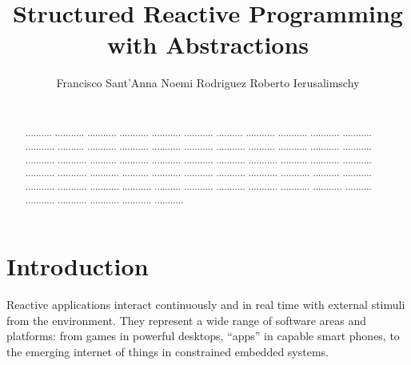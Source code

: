 \documentclass{acm_proc_article-sp}
\newcommand{\1}{\;}
\newcommand{\2}{\;\;}
\newcommand{\3}{\;\;\;}
\newcommand{\5}{\;\;\;\;\;}
\begin{document}
\title {
    Structured Reactive Programming with Abstractions
}

\author{
    \alignauthor
    Francisco Sant'Anna \hspace{1cm} Noemi Rodriguez \hspace{1cm} Roberto Ierusalimschy   \\
     \\
}

\maketitle

\begin{abstract}
.......... ........... ........... ........... ........... ...........
.......... ........... ........... ........... ........... ...........
.......... ........... ........... ........... ........... ...........
.......... ........... ........... ........... ........... ...........
.......... ........... ........... ........... ........... ...........
.......... ........... ........... ........... ........... ...........
.......... ........... ........... ........... ........... ...........
.......... ........... ........... ........... ........... ...........
.......... ........... ........... ........... ........... ...........
.......... ........... ........... ........... ........... ...........
\end{abstract}




\section{Introduction}
\label{sec.intro}

Reactive applications interact continuously and in real time with external 
stimuli from the environment.
They represent a wide range of software areas and platforms: from games in 
powerful desktops, ``apps'' in capable smart phones, to the emerging internet 
of things in constrained embedded systems.
\end{document}
